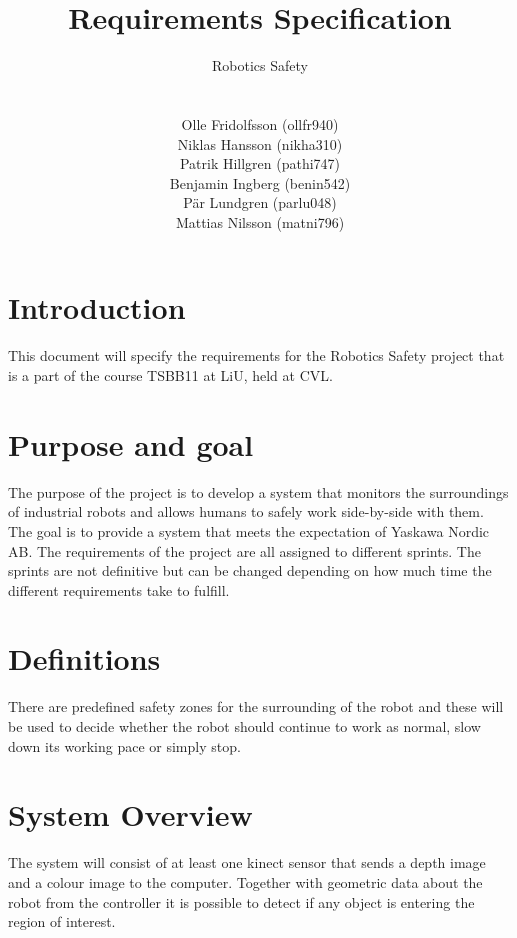 \documentclass[10pt,a4paper]{article}
\title{Requirements Specification}
\author{\begin{large}{Robotics Safety}\end{large}\\\\
Olle Fridolfsson (ollfr940) \\  Niklas Hansson (nikha310) \\ Patrik Hillgren (pathi747) \\ Benjamin Ingberg (benin542)\\ Pär Lundgren (parlu048) \\ Mattias Nilsson (matni796)}
\begin{document}
\maketitle
\newpage
\tableofcontents
\newpage
\noindent %
\section{Introduction}
This document will specify the requirements for the Robotics Safety project that is a part of the course TSBB11 at LiU, held at CVL.
\section{Purpose and goal}
The purpose of the project is to develop a system that monitors the surroundings of industrial robots and allows humans to safely work side-by-side with them. 
The goal is to provide a system that meets the expectation of Yaskawa Nordic AB.
The requirements of the project are all assigned to different sprints. The sprints are not definitive but can be changed depending on how much time the different requirements take to fulfill. 

\section{Definitions}
There are predefined safety zones for the surrounding of the robot and these will be used to decide whether the robot should continue to work as normal, slow down its working pace or simply stop.

\section{System Overview}
The system will consist of at least one kinect sensor that sends a depth image and a colour image to the computer. Together with geometric data about the robot from the controller it is possible to detect if any object is entering the region of interest.
\end{document}
